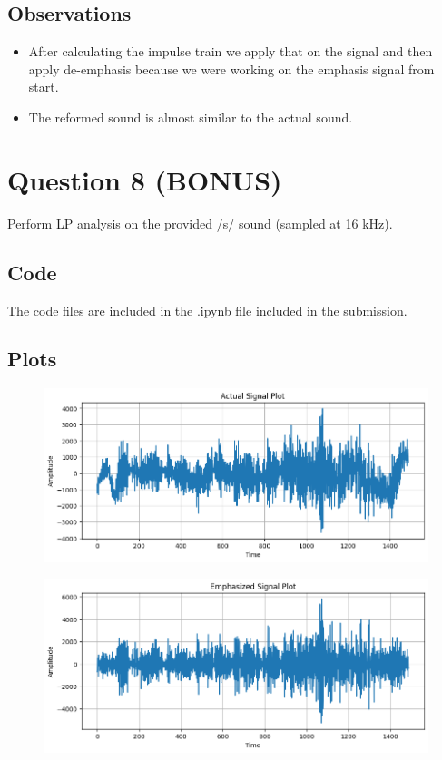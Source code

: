 \documentclass{article}
\begin{document}
\subsection{Observations}
\begin{itemize}
\item After calculating the impulse train we apply that on the signal and then apply de-emphasis because we were working on the emphasis signal from start.
\item The reformed sound is almost similar to the actual sound.
\end{itemize}


\section{Question 8 (BONUS)}

Perform LP analysis on the provided /s/ sound (sampled at 16 kHz).


\subsection{Code}

The code files are included in the .ipynb file included in the submission.

\subsection{Plots}

\begin{figure}[H]
\begin{center}
\includegraphics[scale = 0.5]{act2.png}
\end{center}
\end{figure}

\begin{figure}[H]
\begin{center}
\includegraphics[scale = 0.5]{emph2.png}
\end{center}
\end{figure}
\end{document}
